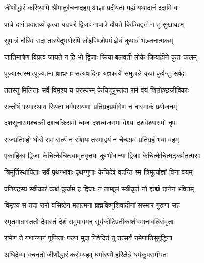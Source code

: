 \resetShloka


\twolineshloka
{जीर्णोद्धारं करिष्यामि श्रीमातुर्वचनादहम्}
{आज्ञा प्रदीयतां मह्यं यथादानं ददामि वः}%

\twolineshloka
{पात्रे दानं प्रदातव्यं कृत्वा यज्ञवरं द्विजाः}
{नापात्रे दीयते किञ्चिद्दत्तं न तु सुखावहम्}%

\twolineshloka
{सुपात्रं नौरिव सदा तारयेदुभयोरपि}
{लोहपिण्डोपमं ज्ञेयं कुपात्रं भञ्जनात्मकम्}%

\twolineshloka
{जातिमात्रेण विप्रत्वं जायते न हि भो द्विजाः}
{क्रिया बलवती लोके क्रियाहीने कुतः फलम्}%

\twolineshloka
{पूज्यास्तस्मात्पूज्यतमा ब्राह्मणाः सत्यवादिनः}
{यज्ञकार्ये समुत्पन्ने कृपां कुर्वन्तु सर्वदा}%


\twolineshloka
{ततस्तु मिलिताः सर्वे विमृश्य च परस्परम्}
{केचिदूचुस्तदा रामं वयं शिलोञ्छजीविकाः}%

\twolineshloka
{सन्तोषं परमास्थाय स्थिता धर्मपरायणाः}
{प्रतिग्रहप्रयोगेण न चास्माकं प्रयोजनम्}%

\twolineshloka
{दशसूनासमश्चक्री दशचक्रिसमो ध्वजः}
{दशध्वजसमा वेश्या दशवेश्यासमो नृपः}%

\twolineshloka
{राजप्रतिग्रहो घोरो राम सत्यं न संशयः}
{तस्माद्वयं न चेच्छामः प्रतिग्रहं भया वहम्}%

\twolineshloka
{एकाहिका द्विजाः केचित्केचित्स्वामृतवृत्तयः}
{कुम्भीधान्या द्विजाः केचित्केचित्षट्कर्मतत्पराः}%

\twolineshloka
{त्रिमूर्तिस्थापिताः सर्वे पृथग्भावाः पृथग्गुणाः}
{केचिदेवं वदन्ति स्म त्रिमूर्त्याज्ञां विना वयम्}%

\twolineshloka
{प्रतिग्रहस्य स्वीकारं कथं कुर्याम ह द्विजाः}
{न ताम्बूलं स्त्रीकृतं नो ह्यद्मो दानेन भषितम्}%

\twolineshloka
{विमृश्य स तदा रामो वसिष्ठेन महात्मना}
{ब्रह्मविष्णुशिवादीनां सस्मार गुरुणा सह}

\twolineshloka
{स्मृतमात्रास्ततो देवास्तं देशं समुपागमन्}
{सूर्यकोटिप्रतीकाशीवमानावलिसंवृताः}%

\twolineshloka
{रामेण ते यथान्यायं पूजिताः परया मुदा}%
{निवेदितं तु तत्सर्वं रामेणातिसुबुद्धिना}%

\twolineshloka
{अधिदेव्या वचनतो जीर्णोद्धारं करोम्यहम्}
{धर्मारण्ये हरिक्षेत्रे धर्मकूपसमीपतः}%

